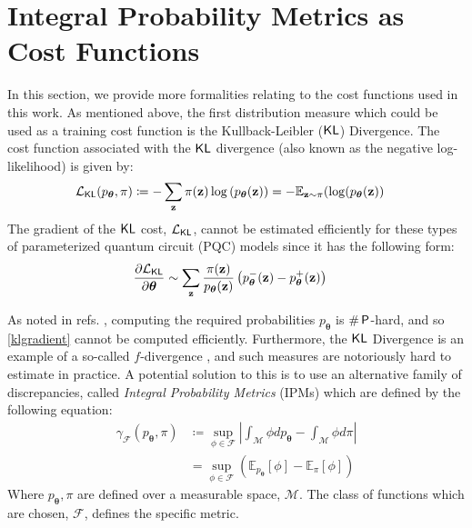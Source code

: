 \section{Integral Probability Metrics as Cost Functions}
\label{supp_matt:cf_and_ipms}

In this section, we provide more formalities relating to the cost functions used in this work.
As mentioned above, the first distribution measure which could be used as a training cost function is the Kullback-Leibler ($\operatorname{\textsf{KL}}$) Divergence. The cost function associated with the $\operatorname{\textsf{KL}}$ divergence (also known as the negative log-likelihood) is given by:
\begin{align}
    &\mathcal{L}_{\operatorname{\textsf{KL}}}(p_{\boldsymbol\theta}, \pi) \coloneqq -\sum\limits_{\mathbf{z}} \pi(\mathbf{z})\log\left(p_{\boldsymbol\theta}(\mathbf{z})\right)  = -\mathbb{E}_{\mathbf{z}\sim\pi}(\log(p_{\boldsymbol\theta}(\mathbf{z}))\label{klcostfunction}
\end{align}
The gradient of the $\operatorname{\textsf{KL}}$ cost, $\mathcal{L}_{\operatorname{\textsf{KL}}}$, cannot be estimated efficiently for these types of parameterized quantum circuit (PQC) models since it has the following form:
\begin{align}
\frac{\partial\mathcal{L}_{\operatorname{\textsf{KL}}}}{\partial {\boldsymbol\theta}} 
& \sim \sum\limits_{\mathbf{z}}\frac{\pi(\mathbf{z})}{{p_{\boldsymbol\theta}(\mathbf{z})}}\left(p^-_{\boldsymbol\theta}(\mathbf{z})- p^+_{\boldsymbol\theta}(\mathbf{z})\right) \label{klgradient}
\end{align}


\noindent As noted in refs. , computing the required probabilities $p_{\boldsymbol\theta}$ is $\#\operatorname{\textsf{P}}$-hard, and so \eqref{klgradient} cannot be computed efficiently.
Furthermore, the $\operatorname{\textsf{KL}}$ Divergence is an example of a so-called $f$-divergence , and such measures are notoriously hard to estimate in practice. A potential solution to this is to use an alternative family of discrepancies, called \textit{Integral Probability Metrics} (IPMs) which are defined by the following equation:
\begin{align}
    \gamma_{\mathcal{F}}(p_{\boldsymbol\theta}, \pi) &  \coloneqq \sup_{\phi \in \mathcal{F}}\left|\int_{\mathcal{M}}\phi dp_{\boldsymbol\theta}-\int_{\mathcal{M}}\phi d\pi\right| \label{ipmequation}\\
    &= \sup_{\phi \in \mathcal{F}}\left(\mathbb{E}_{p_{\boldsymbol\theta}}[\phi]- \mathbb{E}_{\pi}[\phi]\right) 
\end{align}
Where $p_{\boldsymbol\theta}, \pi$ are defined over a measurable space, $\mathcal{M}$. The class of functions which are chosen, $\mathcal{F}$, defines the specific metric.

